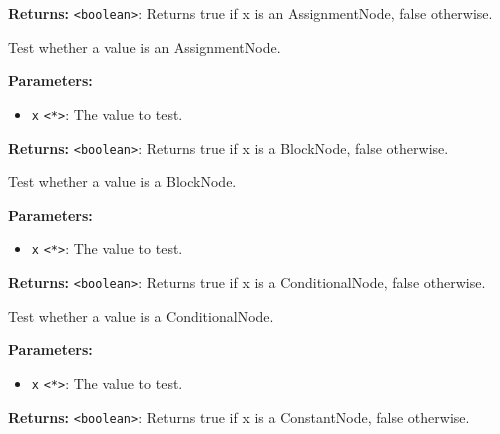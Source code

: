 \documentclass[12pt,a4paper]{article}
\begin{document}
\noindent \textbf{Returns:} \texttt{<boolean>}: Returns true if \textasciigrave{}x\textasciigrave{} is an AssignmentNode, false otherwise.

\noindent Test whether a value is an AssignmentNode.

\vspace{5mm}
\noindent {}


\noindent \textbf{Parameters:}
\begin{itemize}
  \item \texttt{x} \texttt{<*>}: The value to test.
\end{itemize}

\noindent \textbf{Returns:} \texttt{<boolean>}: Returns true if \textasciigrave{}x\textasciigrave{} is a BlockNode, false otherwise.

\noindent Test whether a value is a BlockNode.

\vspace{5mm}
\noindent {}


\noindent \textbf{Parameters:}
\begin{itemize}
  \item \texttt{x} \texttt{<*>}: The value to test.
\end{itemize}

\noindent \textbf{Returns:} \texttt{<boolean>}: Returns true if \textasciigrave{}x\textasciigrave{} is a ConditionalNode, false otherwise.

\noindent Test whether a value is a ConditionalNode.

\vspace{5mm}
\noindent {}


\noindent \textbf{Parameters:}
\begin{itemize}
  \item \texttt{x} \texttt{<*>}: The value to test.
\end{itemize}

\noindent \textbf{Returns:} \texttt{<boolean>}: Returns true if \textasciigrave{}x\textasciigrave{} is a ConstantNode, false otherwise.
\end{document}
